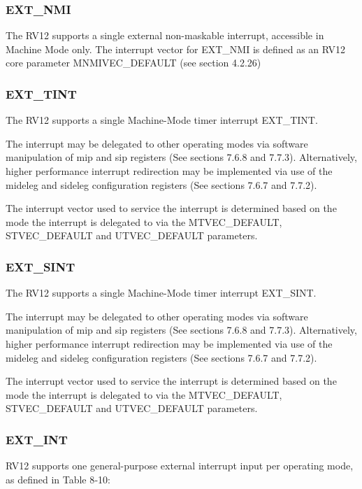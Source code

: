 \subsubsection{EXT\_NMI}\label{ext_nmi}

The RV12 supports a single external non-maskable interrupt, accessible
in Machine Mode only. The interrupt vector for EXT\_NMI is defined as an
RV12 core parameter MNMIVEC\_DEFAULT (see section 4.2.26)

\subsubsection{EXT\_TINT}\label{ext_tint}

The RV12 supports a single Machine-Mode timer interrupt EXT\_TINT.

The interrupt may be delegated to other operating modes via software
manipulation of mip and sip registers (See sections 7.6.8 and 7.7.3).
Alternatively, higher performance interrupt redirection may be
implemented via use of the mideleg and sideleg configuration registers
(See sections 7.6.7 and 7.7.2).

The interrupt vector used to service the interrupt is determined based
on the mode the interrupt is delegated to via the MTVEC\_DEFAULT,
STVEC\_DEFAULT and UTVEC\_DEFAULT parameters.

\subsubsection{EXT\_SINT}\label{ext_sint}

The RV12 supports a single Machine-Mode timer interrupt EXT\_SINT.

The interrupt may be delegated to other operating modes via software
manipulation of mip and sip registers (See sections 7.6.8 and 7.7.3).
Alternatively, higher performance interrupt redirection may be
implemented via use of the mideleg and sideleg configuration registers
(See sections 7.6.7 and 7.7.2).

The interrupt vector used to service the interrupt is determined based
on the mode the interrupt is delegated to via the MTVEC\_DEFAULT,
STVEC\_DEFAULT and UTVEC\_DEFAULT parameters.

\subsubsection{EXT\_INT}\label{ext_int}

RV12 supports one general-purpose external interrupt input per operating
mode, as defined in Table 8‑10:

